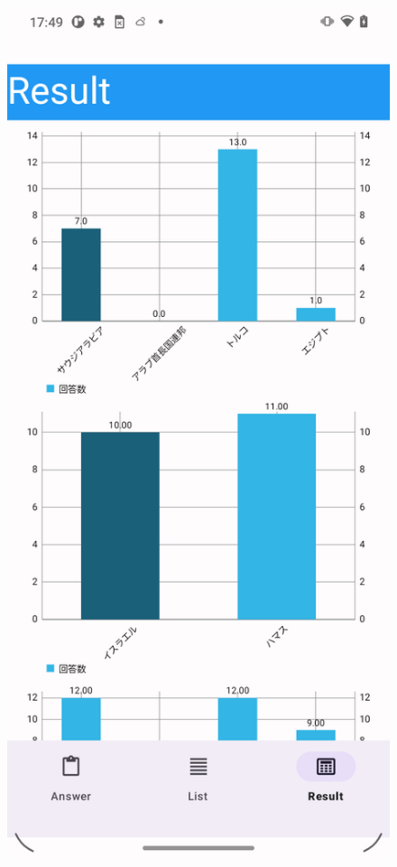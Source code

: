 \documentclass[titlepage,a4paper]{jsarticle}
\begin{document}
\begin{figure}[H]
\begin{minipage}[t]{0.3\textwidth}
  \end{minipage}
  \hfill
  \begin{minipage}[t]{0.3\textwidth}
    \centering
    \includegraphics[height=0.4\textheight]{img/move/app4.png}

\end{minipage}
\end{figure}
\end{document}
